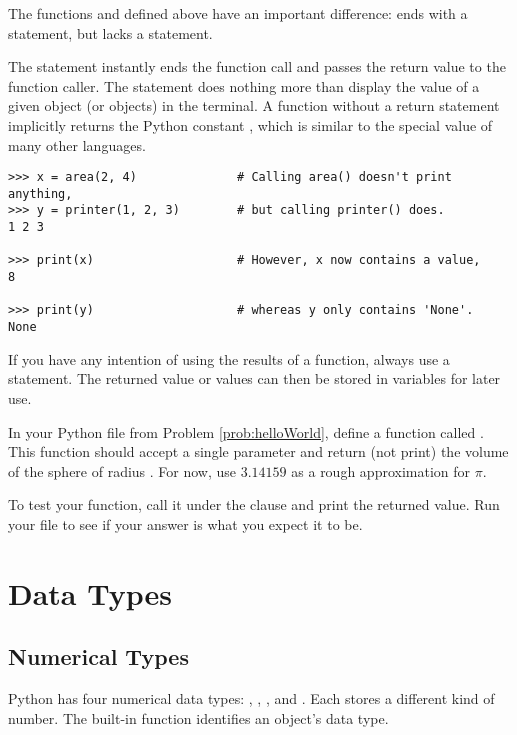 \begin{info}
The functions  and  defined above have an important difference:  ends with a  statement, but  lacks a  statement.

The  statement instantly ends the function call and passes the return value to the function caller.
The  statement does nothing more than display the value of a given object (or objects) in the terminal. %
A function without a return statement implicitly returns the Python constant , which is similar to the  special value of many other languages.

\begin{lstlisting}
>>> x = area(2, 4)              # Calling area() doesn't print anything,
>>> y = printer(1, 2, 3)        # but calling printer() does.
1 2 3

>>> print(x)                    # However, x now contains a value,
8

>>> print(y)                    # whereas y only contains 'None'.
None
\end{lstlisting}

If you have any intention of using the results of a function, always use a  statement.
The returned value or values can then be stored in variables for later use.
\end{info}

\begin{problem}
In your Python file from Problem \ref{prob:helloWorld}, define a function called .
This function should accept a single parameter  and return (not print) the volume of the sphere of radius .
For now, use $3.14159$ as a rough approximation for $\pi$.

To test your function, call it under the  clause and print the returned value.
Run your file to see if your answer is what you expect it to be.
\end{problem}

\section*{Data Types}


\subsection*{Numerical Types}
Python has four numerical data types: , , 
, and .
Each stores a different kind of number.
The built-in function  identifies an object's data type.

